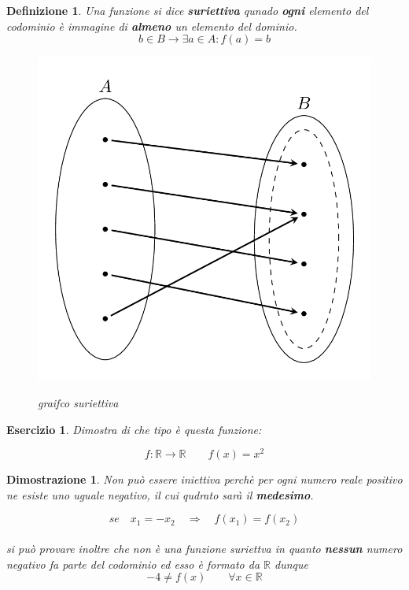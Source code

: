 \documentclass[12pt, a4paper]{article}
\theoremstyle{break}
\newtheorem{defn}{Definizione}
\theoremstyle{lemma}
\newtheorem{eser}{Esercizio}
\theoremstyle{lemma}
\newtheorem{dimo}{Dimostrazione}
\theoremstyle{lemma}
\begin{document}
\begin{defn} Una funzione si dice \textbf{suriettiva} qunado \textbf{ogni} elemento del codominio è immagine di \textbf{almeno} un elemento del dominio.
\begin{equation}
  b\in B \rightarrow \exists a \in A : f(a) = b
\end{equation}

\begin{figure}[ht]
	\center
	\includegraphics[scale=0.15]{suriettiva}
	\label{fig:grafico_suriettiva}
	\caption{graifco suriettiva}
\end{figure}
\end{defn}


\begin{eser}
Dimostra di che tipo è questa funzione:\vspace{1.5mm}

\begin{equation}
  f :\mathbb{R}\rightarrow \mathbb{R} \qquad f(x)=x^2
\end{equation}

\end{eser}

\begin{dimo}
Non può essere iniettiva perchè per ogni numero reale positivo ne esiste uno uguale negativo, il cui qudrato sarà il \textbf{medesimo}.\vspace{1.5mm}

\begin{equation}
  se\quad x_1 = -x_2 \quad \Rightarrow \quad f(x_1) = f(x_2)
\end{equation}  \\

\vspace{2mm}
si può provare inoltre che non è una funzione suriettva in quanto \textbf{nessun} numero negativo fa parte del codominio ed esso è formato da $\mathbb{R}$ dunque
\begin{equation}
  -4 \ne f(x) \qquad \forall x \in \mathbb{R}
\end{equation}
\end{dimo}
\end{document}
